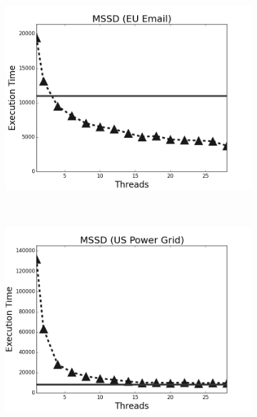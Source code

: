 \begin{figure}[h]
        \centering
        \begin{subfigure}[b]{0.5\textwidth}
                \includegraphics[width=\textwidth]{experiments/scalability/scale-shortest-email.png}
                \label{fig:implementation:scale_sssp_email}
        \end{subfigure}%
        ~
        \begin{subfigure}[b]{0.5\textwidth}
                \includegraphics[width=\textwidth]{experiments/scalability/scale-shortest-uspowergrid.png}


\end{subfigure}
\end{figure}
